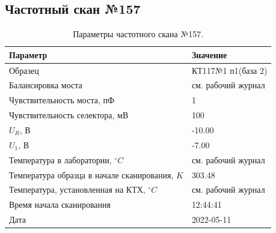 \subsection{Частотный скан №157}
\begin{table}[!ht]
    \centering
    \caption{Параметры частотного скана №157.}
    \begin{tabular}{|l|l|}
        \hline
        Параметр                                       & Значение                  \\ \hline
        Образец                                        & КТ117№1 п1(база 2)        \\ \hline
        Балансировка моста                             & см. рабочий журнал        \\ \hline
        Чувствительность моста, пФ                     & 1                         \\ \hline
        Чувствительность селектора, мВ                 & 100                       \\ \hline
        $U_R$, В                                       & -10.00                    \\ \hline
        $U_1$, В                                       & -7.00                     \\ \hline
        Температура в лаборатории, $^\circ C$          & см. рабочий журнал        \\ \hline
        Температура образца в начале сканирования, $K$ & 303.48                    \\ \hline
        Температура, установленная на КТХ, $^\circ C$  & см. рабочий журнал        \\ \hline
        Время начала сканирования                      & 12:44:41                  \\ \hline
        Дата                                           & 2022-05-11                \\ \hline
    \end{tabular}
    \label{table:frequency_scan_157}
\end{table}

